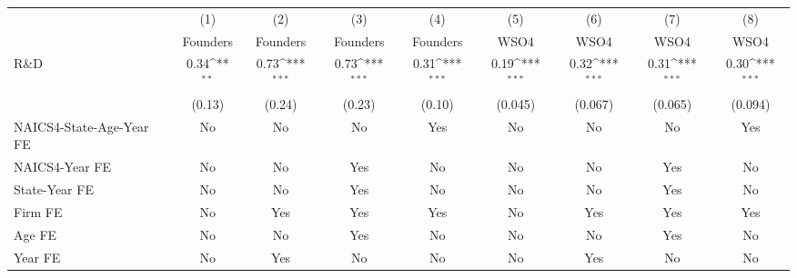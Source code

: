 {
\def\sym#1{\ifmmode^{#1}\else\(^{#1}\)\fi}
\begin{tabular}{l*{8}{c}}
\toprule
                    &\multicolumn{1}{c}{(1)}&\multicolumn{1}{c}{(2)}&\multicolumn{1}{c}{(3)}&\multicolumn{1}{c}{(4)}&\multicolumn{1}{c}{(5)}&\multicolumn{1}{c}{(6)}&\multicolumn{1}{c}{(7)}&\multicolumn{1}{c}{(8)}\\
                    &\multicolumn{1}{c}{Founders}&\multicolumn{1}{c}{Founders}&\multicolumn{1}{c}{Founders}&\multicolumn{1}{c}{Founders}&\multicolumn{1}{c}{WSO4}&\multicolumn{1}{c}{WSO4}&\multicolumn{1}{c}{WSO4}&\multicolumn{1}{c}{WSO4}\\
\midrule
R\&D                &        0.34\sym{**} &        0.73\sym{***}&        0.73\sym{***}&        0.31\sym{***}&        0.19\sym{***}&        0.32\sym{***}&        0.31\sym{***}&        0.30\sym{***}\\
                    &      (0.13)         &      (0.24)         &      (0.23)         &      (0.10)         &     (0.045)         &     (0.067)         &     (0.065)         &     (0.094)         \\
\addlinespace
NAICS4-State-Age-Year FE&          No         &          No         &          No         &         Yes         &          No         &          No         &          No         &         Yes         \\
\addlinespace
NAICS4-Year FE      &          No         &          No         &         Yes         &          No         &          No         &          No         &         Yes         &          No         \\
\addlinespace
State-Year FE       &          No         &          No         &         Yes         &          No         &          No         &          No         &         Yes         &          No         \\
\addlinespace
Firm FE             &          No         &         Yes         &         Yes         &         Yes         &          No         &         Yes         &         Yes         &         Yes         \\
\addlinespace
Age FE              &          No         &          No         &         Yes         &          No         &          No         &          No         &         Yes         &          No         \\
\addlinespace
Year FE             &          No         &         Yes         &          No         &          No         &          No         &         Yes         &          No         &          No         \\

\end{tabular}}
